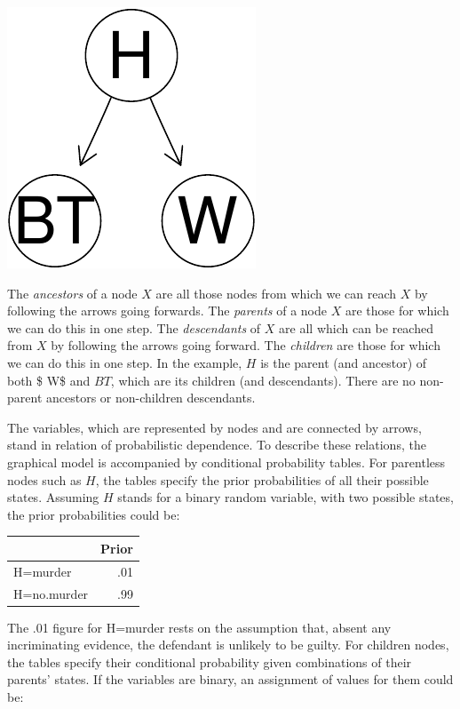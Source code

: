 \documentclass[11pt,dvipsnames,enabledeprecatedfontcommands]{scrartcl}
\begin{document}
\begin{center}\includegraphics{BNfiles/unnamed-chunk-2-1} \end{center}

The \emph{ancestors} of a node \(X\) are all those nodes from which we
can reach \(X\) by following the arrows going forwards. The
\textit{parents} of a node \(X\) are those for which we can do this in
one step. The \textit{descendants} of \(X\) are all which can be reached
from \(X\) by following the arrows going forward. The \textit{children}
are those for which we can do this in one step. In the example, \(H\) is
the parent (and ancestor) of both \$ W\$ and \(BT\), which are its
children (and descendants). There are no non-parent ancestors or
non-children descendants.

The variables, which are represented by nodes and are connected by
arrows, stand in relation of probabilistic dependence. To describe these
relations, the graphical model is accompanied by conditional probability
tables. For parentless nodes such as \(H\), the tables specify the prior
probabilities of all their possible states. Assuming \(H\) stands for a
binary random variable, with two possible states, the prior
probabilities could be:

\begin{table}[H]
\centering
\begin{tabular}{lr}
\toprule
  & Prior\\
\midrule
H=murder & .01\\
H=no.murder & .99\\
\bottomrule
\end{tabular}
\end{table}

\noindent
The .01 figure for H=murder rests on the assumption that, absent any
incriminating evidence, the defendant is unlikely to be guilty. For
children nodes, the tables specify their conditional probability given
combinations of their parents' states. If the variables are binary, an
assignment of values for them could be:
\end{document}
